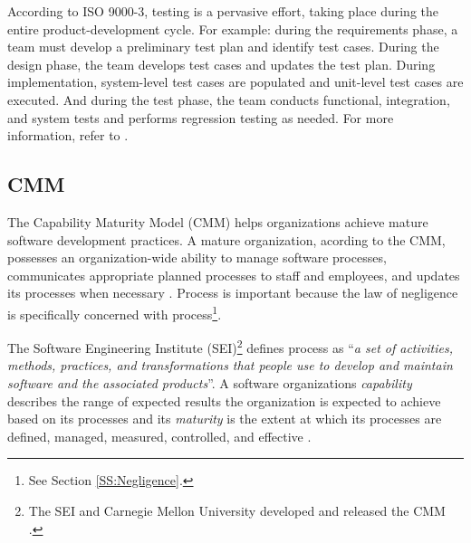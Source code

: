 According to ISO 9000-3, testing is a pervasive effort, taking place during the
entire product-development cycle. For example: during the requirements phase, a
team must develop a preliminary test plan and identify test cases. During the
design phase, the team develops test cases and updates the test plan. During
implementation, system-level test cases are populated and unit-level test cases
are executed. And during the test phase, the team conducts functional,
integration, and system tests and performs regression testing as needed. For
more information, refer to \cite{Kehoe96}.

\subsection{CMM}
The Capability Maturity Model (CMM) helps organizations achieve mature software
development practices. A mature organization, acording to the CMM, possesses an
organization-wide ability to manage software processes, communicates appropriate
planned processes to staff and employees, and updates its processes when
necessary \cite{CMM11}. Process is important because the law of negligence is
specifically concerned with process\footnote{See Section \ref{SS:Negligence}.}.

The Software Engineering Institute (SEI)\footnote{The SEI and Carnegie Mellon
University developed and released the CMM \cite{CMM11}.} defines process as
``\textit{a set of activities, methods, practices, and transformations that 
people use to develop and maintain software and the associated 
products}''\cite{CMM11}. A software organizations \textit{capability} describes
the range of expected results the organization is expected to achieve based on
its processes and its \textit{maturity} is the extent at which its processes are
defined, managed, measured, controlled, and effective \cite{CMM11}.

